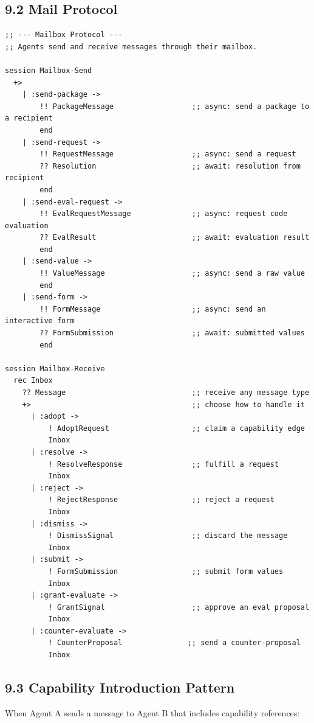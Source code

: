 \documentclass[11pt]{article}
\begin{document}
\subsection{9.2 Mail Protocol}
\label{sec:org1429ebe}

\begin{verbatim}
;; --- Mailbox Protocol ---
;; Agents send and receive messages through their mailbox.

session Mailbox-Send
  +>
    | :send-package ->
        !! PackageMessage                  ;; async: send a package to a recipient
        end
    | :send-request ->
        !! RequestMessage                  ;; async: send a request
        ?? Resolution                      ;; await: resolution from recipient
        end
    | :send-eval-request ->
        !! EvalRequestMessage              ;; async: request code evaluation
        ?? EvalResult                      ;; await: evaluation result
        end
    | :send-value ->
        !! ValueMessage                    ;; async: send a raw value
        end
    | :send-form ->
        !! FormMessage                     ;; async: send an interactive form
        ?? FormSubmission                  ;; await: submitted values
        end

session Mailbox-Receive
  rec Inbox
    ?? Message                             ;; receive any message type
    +>                                     ;; choose how to handle it
      | :adopt ->
          ! AdoptRequest                   ;; claim a capability edge
          Inbox
      | :resolve ->
          ! ResolveResponse                ;; fulfill a request
          Inbox
      | :reject ->
          ! RejectResponse                 ;; reject a request
          Inbox
      | :dismiss ->
          ! DismissSignal                  ;; discard the message
          Inbox
      | :submit ->
          ! FormSubmission                 ;; submit form values
          Inbox
      | :grant-evaluate ->
          ! GrantSignal                    ;; approve an eval proposal
          Inbox
      | :counter-evaluate ->
          ! CounterProposal               ;; send a counter-proposal
          Inbox
\end{verbatim}
\subsection{9.3 Capability Introduction Pattern}
\label{sec:orgc83b88a}

When Agent A sends a message to Agent B that includes capability references:
\end{document}
